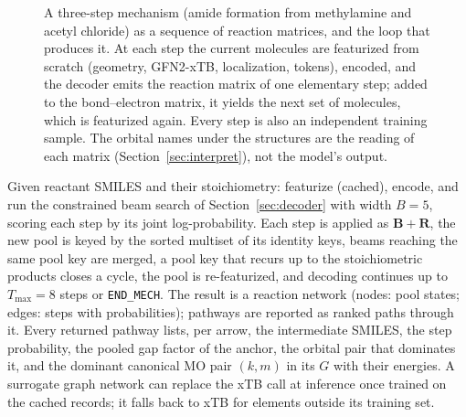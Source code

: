 \documentclass[11pt,a4paper]{article}
\newcommand{\vb}[1]{\bm{#1}}
\begin{document}
\begin{figure}[t]
{}
\caption{A three-step mechanism (amide formation from methylamine and acetyl chloride) as a sequence of reaction matrices, and the loop that produces it. At each step the current molecules are featurized from scratch (geometry, GFN2-xTB, localization, tokens), encoded, and the decoder emits the reaction matrix of one elementary step; added to the bond--electron matrix, it yields the next set of molecules, which is featurized again. Every step is also an independent training sample. The orbital names under the structures are the reading of each matrix (Section~\ref{sec:interpret}), not the model's output.}
\label{fig:loop}
\end{figure}
Given reactant SMILES and their stoichiometry: featurize (cached), encode, and run the constrained beam search of Section~\ref{sec:decoder} with width $B=5$, scoring each step by its joint log-probability. Each step is applied as $\vb{B}+\vb{R}$, the new pool is keyed by the sorted multiset of its identity keys, beams reaching the same pool key are merged, a pool key that recurs up to the stoichiometric products closes a cycle, the pool is re-featurized, and decoding continues up to $T_{\max}=8$ steps or \texttt{END\_MECH}. The result is a reaction network (nodes: pool states; edges: steps with probabilities); pathways are reported as ranked paths through it. Every returned pathway lists, per arrow, the intermediate SMILES, the step probability, the pooled gap factor of the anchor, the orbital pair that dominates it, and the dominant canonical MO pair $(k,m)$ in its $G$ with their energies. A surrogate graph network can replace the xTB call at inference once trained on the cached records; it falls back to xTB for elements outside its training set.
\end{document}

